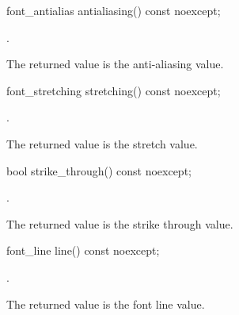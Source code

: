 %
\begin{itemdecl}
font_antialias antialiasing() const noexcept;
\end{itemdecl}
\begin{itemdescr}
\pnum
\returns {}.

\pnum
\remarks
The returned value is the anti-aliasing value.
\end{itemdescr}

%
\begin{itemdecl}
font_stretching stretching() const noexcept;
\end{itemdecl}
\begin{itemdescr}
\pnum
\returns {}.

\pnum
\remarks
The returned value is the stretch value.
\end{itemdescr}

%
\begin{itemdecl}
bool strike_through() const noexcept;
\end{itemdecl}
\begin{itemdescr}
\pnum
\returns {}.

\pnum
\remarks
The returned value is the strike through value.
\end{itemdescr}

%
\begin{itemdecl}
font_line line() const noexcept;
\end{itemdecl}
\begin{itemdescr}
\pnum
\returns {}.

\pnum
\remarks
The returned value is the font line value.
\end{itemdescr}
